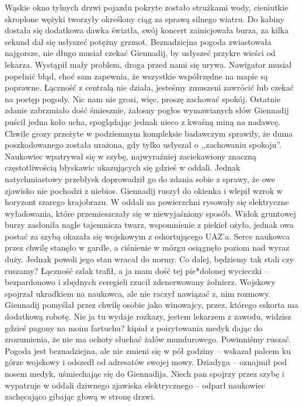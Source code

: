 \documentclass[../MAIN.tex]{subfiles}
\begin{document}
Wąskie okno tylnych drzwi pojazdu pokryte zostało strużkami wody, cieniutkie skroplone wężyki tworzyły określony ciąg za sprawą silnego wiatru. Do kabiny dostała się dodatkowa dawka światła, swój koncert zainicjowała burza, za kilka sekund dał się usłyszeć potężny grzmot. Beznadziejna pogoda zwiastowała najgorsze, nie długo musiał czekać Giennadij, by usłyszeć przykre wieści od lekarza. 
\sx Wystąpił mały problem, droga przed nami się urywa. Nawigator musiał popełnić błąd, choć sam zapewnia, że wszystkie współrzędne na mapie są poprawne. Łączność z centralą nie działa, jesteśmy zmuszeni zawrócić lub czekać na postęp pogody. Nic nam nie grozi, więc, proszę zachować spokój.
\qd
Ostatnie zdanie zabrzmiało dość śmiesznie, żałosny pogłos wymawianych słów Giennadij puścił jedna koło ucha, spoglądając jednak nieco z kwaśną miną na nadawcę. Chwile grozy przeżyte w podziemnym kompleksie badawczym sprawiły, że duma poszkodowanego została urażona, gdy tylko usłyszał o ,,zachowaniu spokoju''.\\ 
Naukowiec wpatrywał się w szybę, najwyraźniej zaciekawiony znaczną częstotliwością błyskawic ukazujących się gdzieś w oddali. Jednak natychmiastowy przebłysk doprowadził go do zdania sobie z sprawy, że owe zjawisko nie pochodzi z niebios. Giennadij ruszył do okienka i wlepił wzrok w horyzont szarego krajobrazu. W oddali na powierzchni rysowały się elektryczne wyładowania, które przemieszczały się w niewyjaśniony sposób. Widok gruntowej burzy zasłoniła nagle tajemnicza twarz, wspomnienie z piekieł ożyło, jednak owa postać za szybą okazała się wojskowym z eskortującego UAZ'a. Serce naukowca przez chwilę stanęło w gardle, a ciśnienie w mózgu osiągnęło poziom nad wyraz duży. Jednak powoli jego stan wracał do normy. 
\sx Co dalej, będziemy tak stali czy ruszamy? Łączność szlak trafił, a ja mam dość tej pie*dolonej wycieczki -- bezpardonowo i zbędnych ceregieli rzucił zdenerwowany żołnierz. 
\qd
Wojskowy spojrzał ukradkiem na naukowca, ale nie raczył nawiązać z, nim rozmowy. Giennadij pomyślał przez chwilę osobie jako winowajcy, przez, którego eskorta ma dodatkową robotę. 
\sx Nie ja tu wydaje rozkazy, jestem lekarzem z zawodu, widzisz gdzieś pagony na moim fartuchu? 
\xx kipiał z poirytowania medyk dając do zrozumienia, że nie ma ochoty słuchać żalów mundurowego. 
\xx Powinniśmy ruszać. Pogoda jest beznadziejna, ale nie zmieni się w pół godziny -- wskazał palcem ku górze wojskowy i odszedł od adresatów swojej mowy. 
\xx Dziadyga -- oznajmił pod nosem medyk, uśmiechając się do Giennadija. 
\xx Niech pan spojrzy przez szybę i wypatruje w oddali dziwnego zjawiska elektrycznego -- odparł naukowiec zachęcająco gibając głową w stronę drzwi. 
\end{document}
